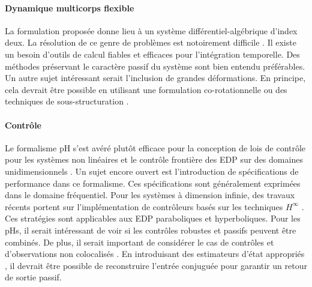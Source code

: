 \paragraph{Dynamique multicorps flexible}
La formulation proposée donne lieu à un système différentiel-algébrique d'index deux. La résolution de ce genre de problèmes est notoirement difficile \cite{brenan1995dae}. Il existe un besoin d'outils de calcul fiables et efficaces pour l'intégration temporelle. Des méthodes préservant le caractère passif du système sont bien entendu préférables. \\ Un autre sujet intéressant serait l'inclusion de grandes déformations. En principe, cela devrait être possible en utilisant une formulation co-rotationnelle ou des techniques de sous-structuration \cite{wu1988substructuring}.

\paragraph{Contrôle}
Le formalisme pH s'est avéré plutôt efficace pour la conception de lois de contrôle pour les systèmes non linéaires \cite{ortega2004survey} et le contrôle frontière des EDP sur des domaines unidimensionnels \cite{macchelli2020exponential}. Un sujet encore ouvert est l'introduction de spécifications de performance dans ce formalisme. Ces spécifications sont généralement exprimées dans le domaine fréquentiel. Pour les systèmes à dimension infinie, des travaux récents portent sur l'implémentation de contrôleurs basés sur les techniques $ H^\infty $ \cite{apkarian2018structured,apkarian2020bd}. Ces stratégies sont applicables aux EDP paraboliques et hyperboliques. Pour les pHs, il serait intéressant de voir si les contrôles robustes et passifs peuvent être combinés. De plus, il serait important de considérer le cas de contrôles et d'observations non colocalisés \cite{cardoso2016}. En introduisant des estimateurs d'état appropriés \cite{yaghmaei2019}, il devrait être possible de reconstruire l'entrée conjuguée pour garantir un retour de sortie passif.

\endgroup